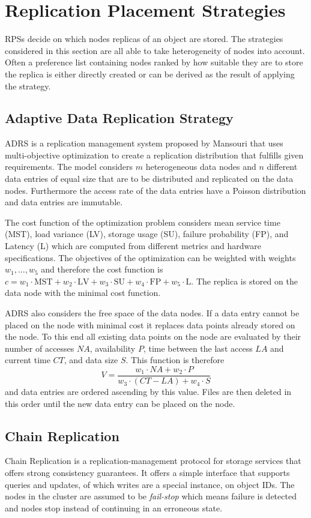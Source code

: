 \section{Replication Placement Strategies}
\acp{RPS} decide on which \glspl{node} replicas of an object are stored.
The strategies considered in this section are all able to take heterogeneity of \glspl{node} into account.
Often a preference list containing \glspl{node} ranked by how suitable they are to store the replica is either directly created or can be derived as the result of applying the strategy.

\subsection{Adaptive Data Replication Strategy}
\ac{ADRS}\cite{Mansouri2016} is a replication management system proposed by Mansouri that uses multi-objective optimization to create a replication distribution that fulfills given requirements.
The model considers $m$ heterogeneous data \glspl{node} and $n$ different data entries of equal size that are to be distributed and replicated on the data \glspl{node}.
Furthermore the access rate of the data entries have a Poisson distribution and data entries are immutable.

The cost function of the optimization problem considers mean service time (MST), load variance (LV), storage usage (SU), failure probability (FP), and Latency (L) which are computed from different metrics and hardware specifications.
The objectives of the optimization can be weighted with weights $w_1,...,w_5$ and therefore the cost function is $c = w_1\cdot\text{MST} + w_2\cdot\text{LV} + w_3\cdot\text{SU} + w_4\cdot\text{FP} + w_5\cdot\text{L}$.
The replica is stored on the data \gls{node} with the minimal cost function.

\ac{ADRS} also considers the free space of the data \glspl{node}.
If a data entry cannot be placed on the \gls{node} with minimal cost it replaces data points already stored on the \gls{node}.
To this end all existing data points on the \gls{node} are evaluated by their number of accesses $NA$, availability $P$, time between the last access $LA$ and current time $CT$, and data size $S$.
This function is therefore
\[
V = \frac{w_1\cdot NA + w_2\cdot P}{w_3\cdot(CT - LA) + w_4\cdot S}
\]
and data entries are ordered ascending by this value.
Files are then deleted in this order until the new data entry can be placed on the \gls{node}.


\subsection{Chain Replication}
\label{sec:chain_replication}
Chain Replication\cite{Renesse2004} is a replication-management protocol for storage services that offers strong consistency guarantees.
It offers a simple interface that supports queries and updates, of which writes are a special instance, on object IDs.
The \glspl{node} in the \gls{cluster} are assumed to be \emph{fail-stop} which means failure is detected and \glspl{node} stop instead of continuing in an erroneous state.

